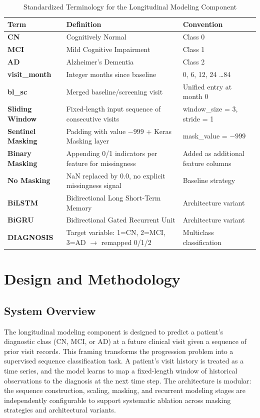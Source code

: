 \documentclass[12pt,singleside,a4paper]{article}
\begin{document}
\begin{table}[h]
\centering
\caption{Standardized Terminology for the Longitudinal Modeling Component}
\begin{tabular}{>{\bfseries}p{3.2cm} p{5.5cm} p{4.5cm}}
\toprule
Term & Definition & Convention \\
\midrule
CN & Cognitively Normal & Class 0 \\
MCI & Mild Cognitive Impairment & Class 1 \\
AD & Alzheimer's Dementia & Class 2 \\
visit\_month & Integer months since baseline & 0, 6, 12, 24 \ldots 84 \\
bl\_sc & Merged baseline/screening visit & Unified entry at month 0 \\
Sliding Window & Fixed-length input sequence of consecutive visits & window\_size = 3, stride = 1 \\
Sentinel Masking & Padding with value $-999$ + Keras Masking layer & mask\_value = $-999$ \\
Binary Masking & Appending 0/1 indicators per feature for missingness & Added as additional feature columns \\
No Masking & NaN replaced by 0.0, no explicit missingness signal & Baseline strategy \\
BiLSTM & Bidirectional Long Short-Term Memory & Architecture variant \\
BiGRU & Bidirectional Gated Recurrent Unit & Architecture variant \\
DIAGNOSIS & Target variable: 1=CN, 2=MCI, 3=AD $\to$ remapped 0/1/2 & Multiclass classification \\
\bottomrule
\end{tabular}
\label{tab:terminology}
\end{table}

\pagebreak
\section{Design and Methodology}

\subsection{System Overview}

The longitudinal modeling component is designed to predict a patient's diagnostic class (CN, MCI, or AD) at a future clinical visit given a sequence of prior visit records. This framing transforms the progression problem into a supervised sequence classification task. A patient's visit history is treated as a time series, and the model learns to map a fixed-length window of historical observations to the diagnosis at the next time step. The architecture is modular: the sequence construction, scaling, masking, and recurrent modeling stages are independently configurable to support systematic ablation across masking strategies and architectural variants.
\end{document}
